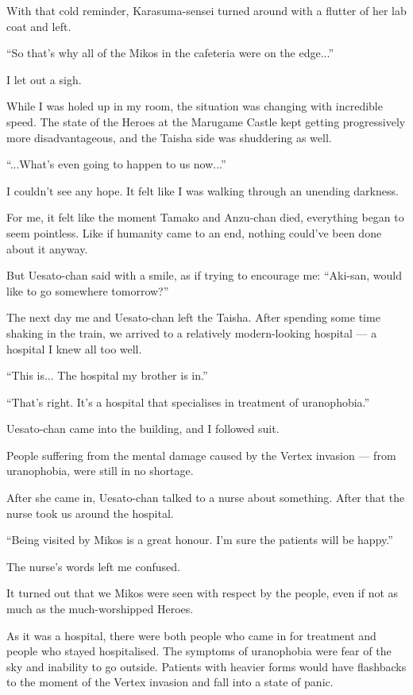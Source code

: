 With that cold reminder, Karasuma-sensei turned around with a flutter of her lab coat and left.

``So that's why all of the Mikos in the cafeteria were on the edge...''

I let out a sigh.

While I was holed up in my room, the situation was changing with incredible speed. The state of the Heroes at the Marugame Castle kept getting progressively more disadvantageous, and the Taisha side was shuddering as well.

``...What's even going to happen to us now...''

I couldn't see any hope. It felt like I was walking through an unending darkness.

For me, it felt like the moment Tamako and Anzu-chan died, everything began to seem pointless. Like if humanity came to an end, nothing could've been done about it anyway.

But Uesato-chan said with a smile, as if trying to encourage me: ``Aki-san, would like to go somewhere tomorrow?''

The next day me and Uesato-chan left the Taisha. After spending some time shaking in the train, we arrived to a relatively modern-looking hospital --- a hospital I knew all too well.

``This is... The hospital my brother is in.''

``That's right. It's a hospital that specialises in treatment of uranophobia.''

Uesato-chan came into the building, and I followed suit.

People suffering from the mental damage caused by the Vertex invasion --- from uranophobia, were still in no shortage.

After she came in, Uesato-chan talked to a nurse about something. After that the nurse took us around the hospital.

``Being visited by Mikos is a great honour. I'm sure the patients will be happy.''

The nurse's words left me confused.

It turned out that we Mikos were seen with respect by the people, even if not as much as the much-worshipped Heroes.

As it was a hospital, there were both people who came in for treatment and people who stayed hospitalised. The symptoms of uranophobia were fear of the sky and inability to go outside. Patients with heavier forms would have flashbacks to the moment of the Vertex invasion and fall into a state of panic.

